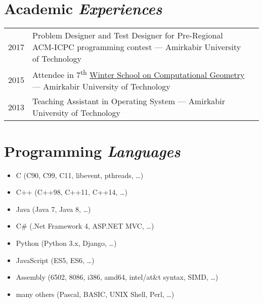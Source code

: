 \documentclass[a4paper,10pt]{article}
\newcommand{\supersc}[1]{\textsuperscript{#1}}
\newcommand{\follownote}[1]{--- {\footnotesize\color{darkblue}#1}}
\begin{document}
\section*{{\color{green}Academic \emph{Experiences}}}
\begin{tabular}{p{1cm}lN}

2017 & \parbox[t]{11cm}{
	Problem Designer and Test Designer for Pre-Regional ACM-ICPC
	programming contest
	\follownote{Amirkabir University of Technology}
} &\\[5mm]

2015 & \parbox[t]{11cm}{
	Attendee in 7\supersc{th} \href{http://wscg.aut.ac.ir}
	{Winter School on Computational Geometry}
	\follownote{Amirkabir University of Technology}
} &\\[5mm]

2013 & \parbox[t]{11cm}{
	Teaching Assistant in Operating System
	\follownote{Amirkabir University of Technology}
} &\\[5mm]

\end{tabular}

\section*{{\color{purple}Programming \emph{Languages}}}
\begin{itemize}
	\item C (C90, C99, C11, libevent, pthreads, \ldots)
	\item C++ (C++98, C++11, C++14, \ldots)
	\item Java (Java 7, Java 8, \ldots)
	\item C\# (.Net Framework 4, ASP.NET MVC, \ldots)
	\item Python (Python 3.x, Django, \ldots)
	\item JavaScript (ES5, ES6, \ldots)
	\item Assembly (6502, 8086, i386, amd64, intel/at\&t syntax,
	    SIMD, \ldots)
	\item many others (Pascal, BASIC, UNIX Shell, Perl, \ldots)
\end{itemize}
\end{document}
